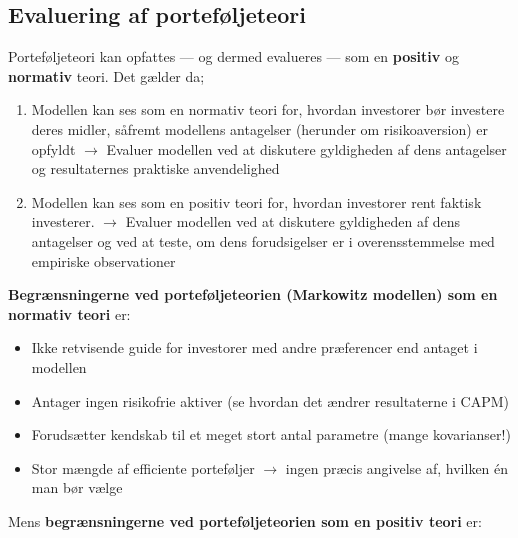 \documentclass[10pt,reqno, usenames]{article}
\begin{document}
\subsection{Evaluering af porteføljeteori}
Porteføljeteori kan opfattes — og dermed evalueres — som en \textbf{positiv} og \textbf{normativ} teori. Det gælder da;

\begin{enumerate}
    \item Modellen kan ses som en normativ teori for, hvordan investorer bør investere deres midler, såfremt modellens antagelser (herunder om risikoaversion) er opfyldt $\rightarrow$ Evaluer modellen ved at diskutere gyldigheden af dens antagelser og resultaternes praktiske anvendelighed
    \item Modellen kan ses som en positiv teori for, hvordan investorer rent faktisk investerer. $\rightarrow$ Evaluer modellen ved at diskutere gyldigheden af dens antagelser og ved at teste, om dens forudsigelser er i overensstemmelse med empiriske observationer
\end{enumerate}


\textbf{Begrænsningerne ved porteføljeteorien (Markowitz modellen) som en normativ teori} er: 

\begin{itemize}
    \item Ikke retvisende guide for investorer med andre præferencer end antaget i modellen
    \item Antager ingen risikofrie aktiver (se hvordan det ændrer resultaterne i CAPM)
    \item Forudsætter kendskab til et meget stort antal parametre (mange kovarianser!)
    \item Stor mængde af efficiente porteføljer $\rightarrow$ ingen præcis angivelse af, hvilken én man bør vælge
\end{itemize}

Mens \textbf{begrænsningerne ved porteføljeteorien som en positiv teori} er: 
\end{document}

